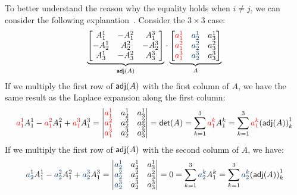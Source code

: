 To better understand the reason why the equality holds when $i \neq j$, we can consider the following explanation~\cite{1404250}. Consider the $3 \times 3$ case:
\[
  \underbrace{\begin{bmatrix}
      A_1^1  & -A_1^2 & A_1^3  \\
      -A_2^1 & A_2^2  & -A_2^3 \\
      A_3^1  & -A_3^2 & A_3^3
    \end{bmatrix}}_{\adj(A)} \cdot \underbrace{\begin{bmatrix}
      {\color{red} a_1^1} & {\color{ustblue} a_2^1} & a_3^1 \\
      {\color{red} a_1^2} & {\color{ustblue} a_2^2} & a_3^2 \\
      {\color{red} a_1^3} & {\color{ustblue} a_2^3} & a_3^3
    \end{bmatrix}}_{A}
\]
If we multiply the first row of $\operatorname{\text{\normalfont\sffamily adj}}(A)$ with the first column of $A$, we have the same result as the Laplace expansion along the first column:
\[
  {\color{red} a_1^1} A_1^1 - {\color{red} a_1^2} A_1^2 + {\color{red} a_1^3} A_1^3 = \begin{vmatrix}
    {\color{red} a_1^1} & a_2^1 & a_3^1 \\
    {\color{red} a_1^2} & a_2^2 & a_3^2 \\
    {\color{red} a_1^3} & a_2^3 & a_3^3
  \end{vmatrix} = \operatorname{\text{\normalfont\sffamily det}}(A) = \sum_{k = 1}^3 {\color{red} a_1^k} A_1^k = \sum_{k = 1}^3 {\color{red} a_1^k} {(\operatorname{\text{\normalfont\sffamily adj}}(A))}_k^1
\]
If we multiply the first row of $\operatorname{\text{\normalfont\sffamily adj}}(A)$ with the second column of $A$, we have:
\[
  {\color{ustblue} a_2^1} A_1^1 - {\color{ustblue} a_2^2} A_1^2 + {\color{ustblue} a_2^3} A_1^3 = \begin{vmatrix}
    {\color{ustblue} a_2^1} & a_2^1 & a_3^1 \\
    {\color{ustblue} a_2^2} & a_2^2 & a_3^2 \\
    {\color{ustblue} a_2^3} & a_2^3 & a_3^3
  \end{vmatrix} = 0 = \sum_{k = 1}^3 {\color{ustblue} a_2^k} A_1^k = \sum_{k = 1}^3 {\color{ustblue} a_2^k} {(\adj(A))}_k^1
\]

